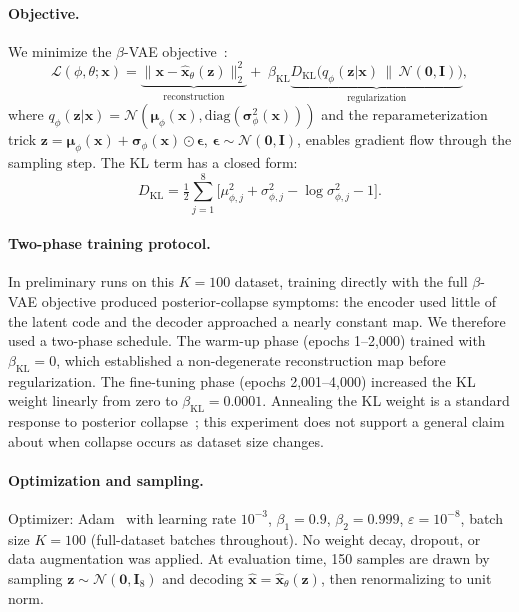 \paragraph{Objective.}
We minimize the $\beta$-VAE objective~\cite{higginsBetaVAELearningBasic2017}:
\begin{equation}
  \mathcal{L}(\phi,\theta;\mathbf{x})
  = \underbrace{\bigl\lVert\mathbf{x}-\hat{\mathbf{x}}_\theta(\mathbf{z})\bigr\rVert_2^2}
    _{\text{reconstruction}}
  +\; \beta_{\mathrm{KL}}\underbrace{D_{\mathrm{KL}}\!\bigl(
    q_\phi(\mathbf{z}|\mathbf{x})\,\big\|\,\mathcal{N}(\mathbf{0},\mathbf{I})\bigr)}
    _{\text{regularization}},
\label{eq:vae-elbo}
\end{equation}
where $q_\phi(\mathbf{z}|\mathbf{x})=\mathcal{N}(\boldsymbol{\mu}_\phi(\mathbf{x}),
\mathrm{diag}(\boldsymbol{\sigma}^2_\phi(\mathbf{x})))$ and the reparameterization trick
$\mathbf{z}=\boldsymbol{\mu}_\phi(\mathbf{x})+\boldsymbol{\sigma}_\phi(\mathbf{x})\odot
\boldsymbol{\epsilon}$, $\boldsymbol{\epsilon}\sim\mathcal{N}(\mathbf{0},\mathbf{I})$,
enables gradient flow through the sampling step.
The KL term has a closed form:
\begin{equation}
  D_{\mathrm{KL}} = \tfrac{1}{2}\sum_{j=1}^{8}\bigl[
    \mu_{\phi,j}^2+\sigma_{\phi,j}^2 - \log\sigma_{\phi,j}^2 - 1\bigr].
\end{equation}

\paragraph{Two-phase training protocol.}
In preliminary runs on this $K=100$ dataset, training directly with the full
$\beta$-VAE objective produced posterior-collapse symptoms: the encoder used
little of the latent code and the decoder approached a nearly constant map. We
therefore used a two-phase schedule. The warm-up phase (epochs 1--2{,}000)
trained with $\beta_{\mathrm{KL}}=0$, which established a non-degenerate
reconstruction map before regularization. The fine-tuning phase (epochs
2{,}001--4{,}000) increased the KL weight linearly from zero to
$\beta_{\mathrm{KL}}=0.0001$. Annealing the KL weight is a standard response to
posterior collapse~\cite{lucasHowAvoidTrivial2019}; this experiment does not
support a general claim about when collapse occurs as dataset size changes.

\paragraph{Optimization and sampling.}
Optimizer: Adam~\cite{kingmaAdamMethodStochastic2014} with learning rate $10^{-3}$,
$\beta_1{=}0.9$, $\beta_2{=}0.999$, $\varepsilon{=}10^{-8}$, batch size $K{=}100$
(full-dataset batches throughout).
No weight decay, dropout, or data augmentation was applied.
At evaluation time, 150 samples are drawn by sampling
$\mathbf{z}\sim\mathcal{N}(\mathbf{0},\mathbf{I}_8)$ and decoding
$\hat{\mathbf{x}}=\hat{\mathbf{x}}_\theta(\mathbf{z})$, then renormalizing to unit norm.

